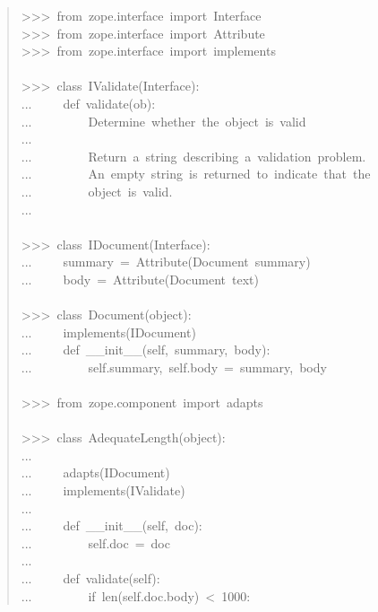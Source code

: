\documentclass[14pt,a4paper,openany,twoside,final]{extbook}
\begin{document}
\begin{quote}{\ttfamily \raggedright \noindent
>{}>{}>~from~zope.interface~import~Interface\\
>{}>{}>~from~zope.interface~import~Attribute\\
>{}>{}>~from~zope.interface~import~implements\\
~\\
>{}>{}>~class~IValidate(Interface):\\
...~~~~~def~validate(ob):\\
...~~~~~~~~~\textquotedbl{}\textquotedbl{}\textquotedbl{}Determine~whether~the~object~is~valid\\
...\\
...~~~~~~~~~Return~a~string~describing~a~validation~problem.\\
...~~~~~~~~~An~empty~string~is~returned~to~indicate~that~the\\
...~~~~~~~~~object~is~valid.\\
...~~~~~~~~~\textquotedbl{}\textquotedbl{}\textquotedbl{}\\
~\\
>{}>{}>~class~IDocument(Interface):\\
...~~~~~summary~=~Attribute(\textquotedbl{}Document~summary\textquotedbl{})\\
...~~~~~body~=~Attribute(\textquotedbl{}Document~text\textquotedbl{})\\
~\\
>{}>{}>~class~Document(object):\\
...~~~~~implements(IDocument)\\
...~~~~~def~\_\_init\_\_(self,~summary,~body):\\
...~~~~~~~~~self.summary,~self.body~=~summary,~body\\
~\\
>{}>{}>~from~zope.component~import~adapts\\
~\\
>{}>{}>~class~AdequateLength(object):\\
...\\
...~~~~~adapts(IDocument)\\
...~~~~~implements(IValidate)\\
...\\
...~~~~~def~\_\_init\_\_(self,~doc):\\
...~~~~~~~~~self.doc~=~doc\\
...\\
...~~~~~def~validate(self):\\
...~~~~~~~~~if~len(self.doc.body)~<~1000:\\
}
\end{quote}
\end{document}
